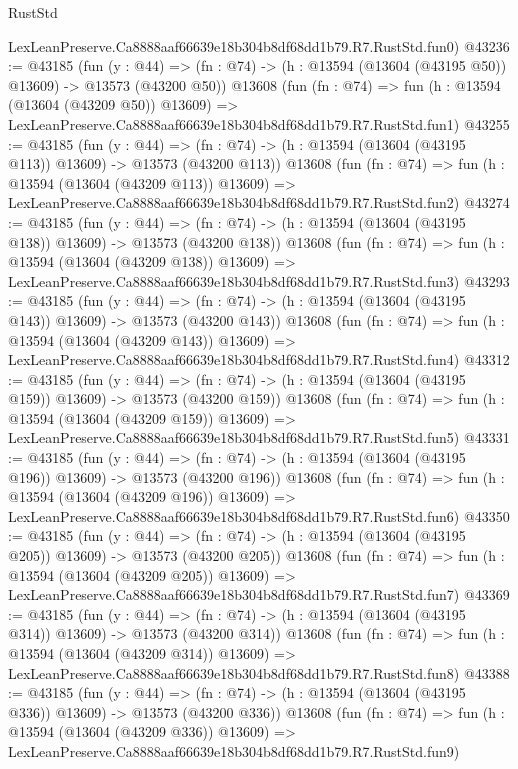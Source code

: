 \begin{lexlean}{RustStd}
\begin{coremodule}
    LexLeanPreserve.Ca8888aaf66639e18b304b8df68dd1b79.R7.RustStd.fun0)
@43236 := @43185
    (fun (y : @44) =>
    (fn : @74) -> (h : @13594 (@13604 (@43195 @50)) @13609) -> @13573 (@43200 @50))
    @13608
    (fun (fn : @74) =>
    fun (h : @13594 (@13604 (@43209 @50)) @13609) =>
    LexLeanPreserve.Ca8888aaf66639e18b304b8df68dd1b79.R7.RustStd.fun1)
@43255 := @43185
    (fun (y : @44) =>
    (fn : @74) -> (h : @13594 (@13604 (@43195 @113)) @13609) -> @13573 (@43200 @113))
    @13608
    (fun (fn : @74) =>
    fun (h : @13594 (@13604 (@43209 @113)) @13609) =>
    LexLeanPreserve.Ca8888aaf66639e18b304b8df68dd1b79.R7.RustStd.fun2)
@43274 := @43185
    (fun (y : @44) =>
    (fn : @74) -> (h : @13594 (@13604 (@43195 @138)) @13609) -> @13573 (@43200 @138))
    @13608
    (fun (fn : @74) =>
    fun (h : @13594 (@13604 (@43209 @138)) @13609) =>
    LexLeanPreserve.Ca8888aaf66639e18b304b8df68dd1b79.R7.RustStd.fun3)
@43293 := @43185
    (fun (y : @44) =>
    (fn : @74) -> (h : @13594 (@13604 (@43195 @143)) @13609) -> @13573 (@43200 @143))
    @13608
    (fun (fn : @74) =>
    fun (h : @13594 (@13604 (@43209 @143)) @13609) =>
    LexLeanPreserve.Ca8888aaf66639e18b304b8df68dd1b79.R7.RustStd.fun4)
@43312 := @43185
    (fun (y : @44) =>
    (fn : @74) -> (h : @13594 (@13604 (@43195 @159)) @13609) -> @13573 (@43200 @159))
    @13608
    (fun (fn : @74) =>
    fun (h : @13594 (@13604 (@43209 @159)) @13609) =>
    LexLeanPreserve.Ca8888aaf66639e18b304b8df68dd1b79.R7.RustStd.fun5)
@43331 := @43185
    (fun (y : @44) =>
    (fn : @74) -> (h : @13594 (@13604 (@43195 @196)) @13609) -> @13573 (@43200 @196))
    @13608
    (fun (fn : @74) =>
    fun (h : @13594 (@13604 (@43209 @196)) @13609) =>
    LexLeanPreserve.Ca8888aaf66639e18b304b8df68dd1b79.R7.RustStd.fun6)
@43350 := @43185
    (fun (y : @44) =>
    (fn : @74) -> (h : @13594 (@13604 (@43195 @205)) @13609) -> @13573 (@43200 @205))
    @13608
    (fun (fn : @74) =>
    fun (h : @13594 (@13604 (@43209 @205)) @13609) =>
    LexLeanPreserve.Ca8888aaf66639e18b304b8df68dd1b79.R7.RustStd.fun7)
@43369 := @43185
    (fun (y : @44) =>
    (fn : @74) -> (h : @13594 (@13604 (@43195 @314)) @13609) -> @13573 (@43200 @314))
    @13608
    (fun (fn : @74) =>
    fun (h : @13594 (@13604 (@43209 @314)) @13609) =>
    LexLeanPreserve.Ca8888aaf66639e18b304b8df68dd1b79.R7.RustStd.fun8)
@43388 := @43185
    (fun (y : @44) =>
    (fn : @74) -> (h : @13594 (@13604 (@43195 @336)) @13609) -> @13573 (@43200 @336))
    @13608
    (fun (fn : @74) =>
    fun (h : @13594 (@13604 (@43209 @336)) @13609) =>
    LexLeanPreserve.Ca8888aaf66639e18b304b8df68dd1b79.R7.RustStd.fun9)

\end{coremodule}
\end{lexlean}
